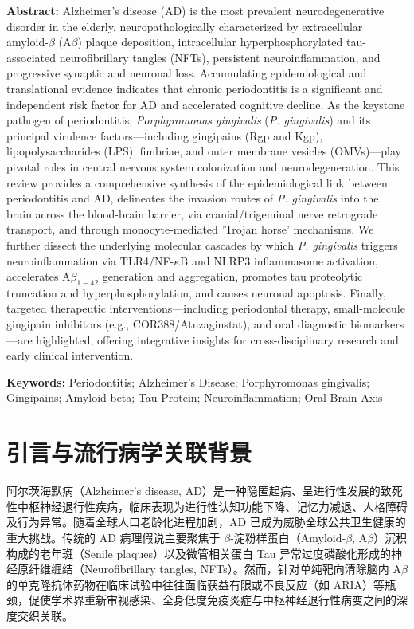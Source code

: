 \documentclass[12pt,a4paper]{ctexart}
\begin{document}
\vspace{0.8em}
\noindent\textbf{Abstract: }Alzheimer's disease (AD) is the most prevalent neurodegenerative disorder in the elderly, neuropathologically characterized by extracellular amyloid-$\beta$ (A$\beta$) plaque deposition, intracellular hyperphosphorylated tau-associated neurofibrillary tangles (NFTs), persistent neuroinflammation, and progressive synaptic and neuronal loss. Accumulating epidemiological and translational evidence indicates that chronic periodontitis is a significant and independent risk factor for AD and accelerated cognitive decline. As the keystone pathogen of periodontitis, \textit{Porphyromonas gingivalis} (\textit{P. gingivalis}) and its principal virulence factors—including gingipains (Rgp and Kgp), lipopolysaccharides (LPS), fimbriae, and outer membrane vesicles (OMVs)—play pivotal roles in central nervous system colonization and neurodegeneration. This review provides a comprehensive synthesis of the epidemiological link between periodontitis and AD, delineates the invasion routes of \textit{P. gingivalis} into the brain across the blood-brain barrier, via cranial/trigeminal nerve retrograde transport, and through monocyte-mediated 'Trojan horse' mechanisms. We further dissect the underlying molecular cascades by which \textit{P. gingivalis} triggers neuroinflammation via TLR4/NF-$\kappa$B and NLRP3 inflammasome activation, accelerates A$\beta_{1-42}$ generation and aggregation, promotes tau proteolytic truncation and hyperphosphorylation, and causes neuronal apoptosis. Finally, targeted therapeutic interventions—including periodontal therapy, small-molecule gingipain inhibitors (e.g., COR388/Atuzaginstat), and oral diagnostic biomarkers—are highlighted, offering integrative insights for cross-disciplinary research and early clinical intervention.

\vspace{0.5em}
\noindent\textbf{Keywords: }Periodontitis; Alzheimer's Disease; Porphyromonas gingivalis; Gingipains; Amyloid-beta; Tau Protein; Neuroinflammation; Oral-Brain Axis

\newpage
\tableofcontents
\newpage

\section{引言与流行病学关联背景}

阿尔茨海默病（Alzheimer's disease, AD）是一种隐匿起病、呈进行性发展的致死性中枢神经退行性疾病，临床表现为进行性认知功能下降、记忆力减退、人格障碍及行为异常。随着全球人口老龄化进程加剧，AD 已成为威胁全球公共卫生健康的重大挑战。传统的 AD 病理假说主要聚焦于 $\beta$-淀粉样蛋白（Amyloid-$\beta$, A$\beta$）沉积构成的老年斑（Senile plaques）以及微管相关蛋白 Tau 异常过度磷酸化形成的神经原纤维缠结（Neurofibrillary tangles, NFTs）\cite{dominy2019, ren2024}。然而，针对单纯靶向清除脑内 A$\beta$ 的单克隆抗体药物在临床试验中往往面临获益有限或不良反应（如 ARIA）等瓶颈，促使学术界重新审视感染、全身低度免疫炎症与中枢神经退行性病变之间的深度交织关联\cite{kamer2008, nieran2019}。
\end{document}
